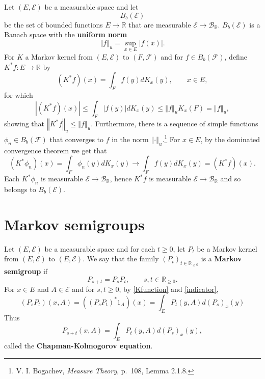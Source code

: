 \documentclass{article}
\newcommand{\norm}[1]{\left\Vert #1 \right\Vert}
\theoremstyle{definition}
\begin{document}
Let $(E,\mathscr{E})$ be a measurable space and let
\[
B_b(\mathscr{E})
\]
 be the set of bounded  functions
$E \to \mathbb{R}$ that are measurable $\mathscr{E} \to \mathscr{B}_{\mathbb{R}}$. $B_b(\mathscr{E})$ is a Banach space with the \textbf{uniform norm}
\[
\norm{f}_u = \sup_{x \in E} |f(x)|. 
\]
For $K$ a Markov kernel from $(E,\mathscr{E})$ to $(F,\mathscr{F})$
and for $f \in B_b(\mathscr{F})$, define
$K^*f:E \to \mathbb{R}$ by
\[
(K^*f)(x) = \int_F f(y) dK_x(y), \qquad x \in E,
\]
for which
\[
|(K^*f)(x)| \leq \int_F |f(y)| dK_x(y) \leq \norm{f}_u K_x(F) = \norm{f}_u,
\]
showing that $\norm{K^*f}_u \leq \norm{f}_u$. Furthermore,
there is a sequence of simple functions
$\phi_n \in B_b(\mathscr{F})$ that converges 
to $f$ in the norm $\norm{\cdot}_u$.\footnote{V. I. Bogachev, {\em Measure Theory}, p.~108, Lemma 2.1.8.}
For $x \in E$, by the dominated convergence theorem we get that
\[
(K^*\phi_n)(x) = \int_F \phi_n(y) dK_x(y) \to \int_F f(y) dK_x(y) = (K^*f)(x).
\]
Each $K^*\phi_n$ is measurable $\mathscr{E} \to \mathscr{B}_{\mathbb{R}}$, hence
$K^*f$ is measurable $\mathscr{E} \to \mathscr{B}_{\mathbb{R}}$ and so belongs to $B_b(\mathscr{E})$. 



\section{Markov semigroups}
Let $(E,\mathscr{E})$ be a measurable space 
and for each $t \geq 0$, let $P_t$ be a Markov kernel from
$(E,\mathscr{E})$ to $(E,\mathscr{E})$. We say
that the family $(P_t)_{t \in \mathbb{R}_{\geq 0}}$ is a \textbf{Markov semigroup}
if 
\[
P_{s+t} = P_s P_t, \qquad s, t \in \mathbb{R}_{\geq 0}.
\]
For $x \in E$ and $A \in \mathscr{E}$ and for $s,t \geq 0$, by  \eqref{Kfunction} and
\eqref{indicator},
\[
(P_s P_t)(x,A) = ((P_s P_t)^*1_A)(x)= \int_E P_t(y,A) d(P_s)_x(y)
\]
Thus
\begin{equation}
P_{s+t}(x,A) = \int_E P_t(y,A) d(P_s)_x(y),
\label{chapman}
\end{equation}
called the \textbf{Chapman-Kolmogorov equation}.
\end{document}
